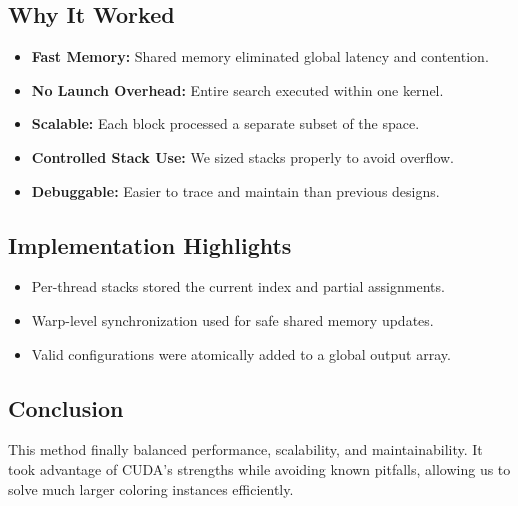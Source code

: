 \documentclass[12pt]{article}
\begin{document}
\subsection*{Why It Worked}
\begin{itemize}
    \item \textbf{Fast Memory:} Shared memory eliminated global latency and contention.
    \item \textbf{No Launch Overhead:} Entire search executed within one kernel.
    \item \textbf{Scalable:} Each block processed a separate subset of the space.
    \item \textbf{Controlled Stack Use:} We sized stacks properly to avoid overflow.
    \item \textbf{Debuggable:} Easier to trace and maintain than previous designs.
\end{itemize}

\subsection*{Implementation Highlights}
\begin{itemize}
    \item Per-thread stacks stored the current index and partial assignments.
    \item Warp-level synchronization used for safe shared memory updates.
    \item Valid configurations were atomically added to a global output array.
\end{itemize}

\subsection*{Conclusion}
This method finally balanced performance, scalability, and maintainability. It took advantage of CUDA’s strengths while avoiding known pitfalls, allowing us to solve much larger coloring instances efficiently.
\end{document}
